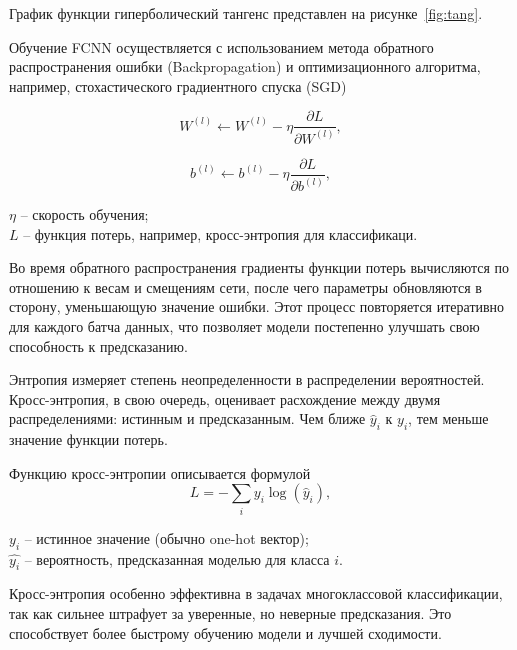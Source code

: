 График функции гиперболический тангенс представлен на рисунке~\ref{fig:tang}.


\anonsection{}Обучение FCNN осуществляется с использованием метода обратного 
распространения ошибки (Backpropagation) и оптимизационного алгоритма, 
например, стохастического градиентного спуска (SGD)

\begin{equation}
    W^{(l)} \leftarrow W^{(l)} - \eta \frac{\partial L}{\partial W^{(l)}},
\end{equation}

\begin{equation}
    b^{(l)} \leftarrow b^{(l)} - \eta \frac{\partial L}{\partial b^{(l)}},
\end{equation}

   $\eta$ – скорость обучения;\\
\hphantom{где} $L$ – функция потерь, например, кросс-энтропия для классификаци.

Во время обратного распространения градиенты функции потерь вычисляются по 
отношению к весам и смещениям сети, после чего параметры обновляются в сторону, 
уменьшающую значение ошибки. Этот процесс повторяется итеративно для каждого 
батча данных, что позволяет модели постепенно улучшать свою способность к 
предсказанию.

Энтропия измеряет степень неопределенности в распределении вероятностей. 
Кросс-энтропия, в свою очередь, оценивает расхождение между двумя 
распределениями: истинным и предсказанным. Чем ближе $\hat{y}_i$ к $y_i$, тем 
меньше значение функции потерь.

Функцию кросс-энтропии описывается формулой 
\begin{equation}
    L = - \sum_{i} y_i \log(\hat{y}_i),
\end{equation}

   \( y_i \) – истинное значение (обычно one-hot вектор);\\
\hphantom{где} \( \hat{y_i} \) – вероятность, предсказанная моделью для класса 
$i$.

Кросс-энтропия особенно эффективна в задачах многоклассовой классификации, так как 
сильнее штрафует за уверенные, но неверные предсказания. Это способствует более 
быстрому обучению модели и лучшей сходимости.

